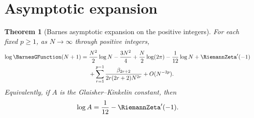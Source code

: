 \documentclass[11pt,a4paper,oneside,openany]{book}
\newtheorem{theorem}{Theorem}[chapter]
\theoremstyle{definition}
\theoremstyle{remark}
\begin{document}
\section{Asymptotic expansion}

\begin{theorem}[Barnes asymptotic expansion on the positive integers]
\label{thm:new-barnes-asymptotic}
For each fixed $p\ge1$, as $N\to\infty$ through positive integers,
\begin{align}
 \log \BarnesGFunction(N+1)
={}&\frac{N^2}{2}\log N-\frac{3N^2}{4}
 +\frac N2\log(2\pi)-\frac1{12}\log N+\RiemannZeta'(-1)
 \notag\\
 &+\sum_{r=1}^{p-1}
 \frac{\beta_{2r+2}}{2r(2r+2)N^{2r}}
 +O(N^{-2p}).
 \label{eq:new-barnes-asymptotic}
\end{align}
Equivalently, if $A$ is the Glaisher--Kinkelin constant, then
\begin{equation}\label{eq:new-glaisher-zeta}
 \log A=\frac1{12}-\RiemannZeta'(-1).
\end{equation}
\end{theorem}
\end{document}
